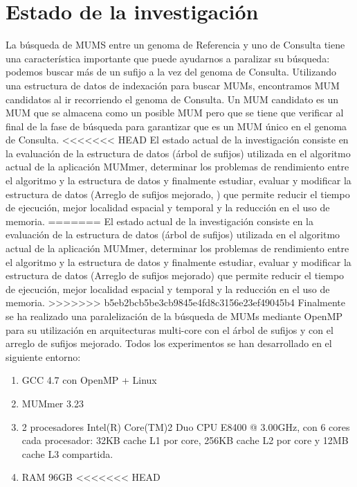 \documentclass[12pt,a4paper]{article}
\begin{document}
\section{Estado de la investigación}
La búsqueda de MUMS entre un genoma de Referencia y uno de Consulta tiene una característica importante que puede ayudarnos a paralizar su búsqueda: podemos buscar más de un sufijo a la vez del genoma de Consulta. Utilizando una estructura de datos de indexación para buscar MUMs, encontramos MUM candidatos al ir recorriendo el genoma de Consulta. Un MUM candidato es un MUM que se almacena como un posible MUM pero que se tiene que verificar al final de la fase de búsqueda para garantizar que es un MUM único en el genoma de Consulta.
<<<<<<< HEAD
El estado actual de la investigación consiste en la evaluación de la estructura de datos (árbol de sufijos) utilizada en el algoritmo actual de la aplicación MUMmer, determinar los problemas de rendimiento entre el algoritmo y la estructura de datos y finalmente estudiar, evaluar y modificar la estructura de datos (Arreglo de sufijos mejorado, \cite{Abouelhoda2004}) que permite reducir el tiempo de ejecución, mejor localidad espacial y temporal y la reducción en el uso de memoria.
=======
El estado actual de la investigación consiste en la evaluación de la estructura de datos (árbol de sufijos) utilizada en el algoritmo actual de la aplicación MUMmer, determinar los problemas de rendimiento entre el algoritmo y la estructura de datos y finalmente estudiar, evaluar y modificar la estructura de datos (Arreglo de sufijos mejorado) que permite reducir el tiempo de ejecución, mejor localidad espacial y temporal y la reducción en el uso de memoria.
>>>>>>> b5eb2bcb5be3cb9845e4fd8c3156e23ef49045b4
Finalmente se ha realizado una paralelización de la búsqueda de MUMs mediante OpenMP para su utilización en arquitecturas multi-core con el árbol de sufijos y con el arreglo de sufijos mejorado.
Todos los experimentos se han desarrollado en el siguiente entorno:
\begin{enumerate}
\item GCC 4.7 con OpenMP + Linux
\item MUMmer 3.23
\item 2 procesadores Intel(R) Core(TM)2 Duo CPU     E8400  @ 3.00GHz, con 6 cores cada procesador: 32KB cache L1 por core, 256KB cache L2 por core y 12MB cache L3 compartida.
\item RAM 96GB
<<<<<<< HEAD
\end{enumerate}
\end{document}
